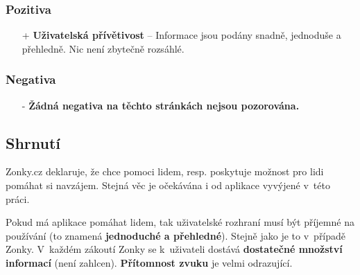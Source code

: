 \subsubsection*{Pozitiva}
\begin{itemize}
    \item[+] \textbf{Uživatelská přívětivost} -- Informace jsou podány snadně, jednoduše a přehledně. Nic není zbytečně rozsáhlé.
\end{itemize}
\subsubsection*{Negativa}
\begin{itemize}
    \item[-] \textbf{Žádná negativa na těchto stránkách nejsou pozorována.}
\end{itemize}



\subsection{Shrnutí}
Zonky.cz deklaruje, že chce pomoci lidem, resp. poskytuje možnost pro lidi pomáhat si navzájem. Stejná věc je očekávána i od aplikace vyvýjené v~této práci.

Pokud má aplikace pomáhat lidem, tak uživatelské rozhraní musí být příjemné na používání (to znamená \textbf{jednoduché a přehledné}). Stejně jako je to v~případě Zonky. V~každém zákoutí Zonky se k~uživateli dostává \textbf{dostatečné množství informací} (není zahlcen). \textbf{Přítomnost zvuku} je velmi odrazující.